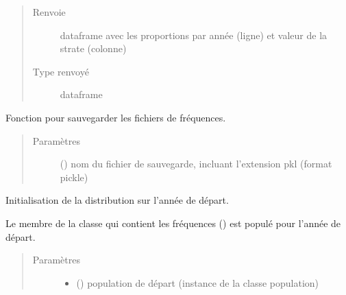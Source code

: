 \documentclass[letterpaper,10pt,french]{sphinxmanual}
\begin{document}
\begin{fulllineitems}
\begin{fulllineitems}
\begin{quote}
\begin{description}
\begin{itemize}
\end{itemize}

\item[{Renvoie}] \leavevmode
dataframe avec les proportions par année (ligne) et valeur de la strate (colonne)

\item[{Type renvoyé}] \leavevmode
dataframe

\end{description}\end{quote}

\end{fulllineitems}


\begin{fulllineitems}
\label{\detokenize{code:simgen.statistics.save}}
Fonction pour sauvegarder les fichiers de fréquences.
\begin{quote}\begin{description}
\item[{Paramètres}] \leavevmode
{} () \textendash{} nom du fichier de sauvegarde, incluant l’extension pkl (format pickle)

\end{description}\end{quote}

\end{fulllineitems}


\begin{fulllineitems}
\label{\detokenize{code:simgen.statistics.start}}
Initialisation de la distribution sur l’année de départ.

Le membre de la classe qui contient les fréquences () est populé pour l’année de départ.
\begin{quote}\begin{description}
\item[{Paramètres}] \leavevmode\begin{itemize}
\item {} 
 ({\hyperref[\detokenize{code:simgen.population}]{}}) \textendash{} population de départ (instance de la classe population)


\end{itemize}
\end{description}
\end{quote}
\end{fulllineitems}
\end{fulllineitems}
\end{document}
